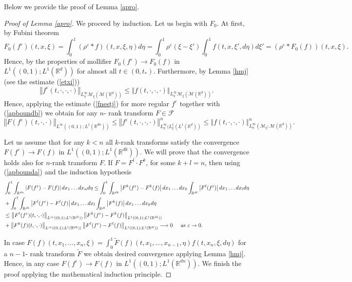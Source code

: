 \documentclass[10pt]{article}
\newcommand{\eqq}[2]{\begin{equation}  #1  \label{#2}\end{equation}    }
\newcommand{\hd}{\hspace{0.2cm}}
\newcommand{\m}[1]{\mbox{#1}}
\newcommand*{\norm}[1]{\left\Vert{#1}\right\Vert}
\newcommand*{\abs}[1]{\left\vert{#1}\right\vert}
\newcommand{\ve}{\varepsilon}
\newcommand{\R}{\mathbb{R}}
\newcommand{\izj}{\int_{0}^{1}}
\begin{document}
Below we provide the proof of Lemma \ref{apro}. 

\begin{proof}[Proof of Lemma \ref{apro}]
 We proceed by induction. Let us begin with $F_0$. At first, by Fubini theorem
\[
F_0(f^\ve)(t,x,\xi) = \izj (\rho^\ve * f)(t,x,\xi,\eta)d\eta = \izj  \rho^\ve(\xi-\xi')\izj f(t,x,\xi',d\eta) d\xi' = (\rho^\ve * F_0(f))(t,x,\xi).
\]
Hence, by the properties of mollifier $F_0(f^\ve) \rightarrow F_0(f)$ in $L^{1}((0,1);L^{1}(\R^d))$ for almost all $t \in (0,t_{*})$. Furthermore, by Lemma \ref{hmj} (see the estimate (\ref{etxi}))
\eqq{
\norm{f^\ve(t,\cdot,\cdot,\cdot)}_{L^{\infty}_\eta\mathcal{M}_{\xi}(\mathcal{M}(\R^d))} \leq \norm{f(t,\cdot,\cdot,\cdot)}_{L^{\infty}_\eta\mathcal{M}_{\xi}(\mathcal{M}(\R^d))}.
}{apboundb}
Hence, applying the estimate (\ref{fnestj}) for more regular $f^\ve$ together with (\ref{apboundb}) we obtain for any $n$- rank transform $F \in \mathcal{F}$
\eqq{
\norm{F(f^\ve)(t,\cdot,\cdot)}_{L^{\infty}((0,1);L^{1}(\R^{dn}))}\leq \norm{f^\ve(t,\cdot,\cdot,\cdot)}_{L^{\infty}_\eta(L^{1}_\xi(L^{1}(\R^{d}))}^n \leq  \norm{f(t,\cdot,\cdot,\cdot)}_{L^{\infty}_\eta(\mathcal{M}_{\xi};\mathcal{M}(\R^d))}^n.
}{apbounda}

Let us assume that for any $k < n$ all $k$-rank transforms satisfy the convergence $F(f^\ve) \rightarrow F(f)$ in $L^{1}((0,1);L^{1}(\R^{dk}))$. We will prove that the convergence holds also for  $n$-rank transform $F$. If $F = F^l\cdot F^k$, for some $k+l = n$, then using (\ref{apbounda}) and the induction hypothesis
\begin{align*}
 &\int_0^1 \int_{\R^{dn}}\abs{F(f^\ve)-F(f)}dx_1\dots dx_n d\eta \leq \int_0^1 \int_{\R^{dk}}\abs{F^k(f^\ve)-F^k(f)}dx_1\dots dx_k  \int_{\R^{dl}}\abs{F^l(f^\ve)}dx_{1}\dots dx_{l}d\eta\\
 & +\int_0^1 \int_{\R^{dk}}\abs{F^l(f^\ve)-F^l(f)}dx_1\dots dx_l  \int_{\R^{dl}}\abs{F^k(f)}dx_{1}\dots dx_{k}d\eta\\
 &\leq \norm{F^l(f^\ve)(t,\cdot,\cdot)}_{L^{\infty}((0,1);L^{1}(\R^{dl}))} \norm{F^{k}(f^\ve)-F^k(f)}_{L^{1}((0,1);L^{1}(\R^{dk}))} \\
 &+ \norm{F^k(f)(t,\cdot,\cdot)}_{L^{\infty}((0,1);L^{1}(\R^{dk}))} \norm{F^{l}(f^\ve)-F^l(f)}_{L^{1}((0,1);L^{1}(\R^{dl}))} \longrightarrow 0 \hd \hd \m{ as } \ve \rightarrow 0.
\end{align*}

In case $F(f)(t,x_1,\dots,x_n,\xi) = \izj \tilde{F}(f)(t,x_1,\dots,x_{n-1},\eta)f(t,x_{n},\xi,d\eta)$ for a $n-1$- rank transform $\tilde{F}$ we obtain desired convergence applying Lemma \ref{hmj}.
 Hence, in any case $F(f^\ve) \rightarrow F(f)$ in $L^{1}((0,1);L^{1}(\R^{dn}))$.  We finish the proof applying the mathematical induction principle.
\end{proof}
\end{document}
